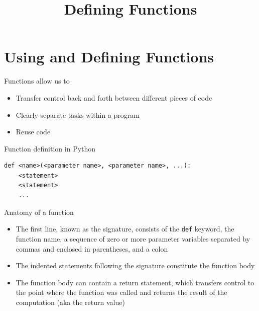 \documentclass[8pt,a4paper,compress]{beamer}
\title{Defining Functions}
\date{}
\begin{document}
\begin{frame}
\vfill
\titlepage
\end{frame}

\section{Using and Defining Functions}
\begin{frame}[fragile]
\pause

Functions allow us to
\begin{itemize}
\pause
\item Transfer control back and forth between different pieces of code
\pause
\item Clearly separate tasks within a program
\pause
\item Reuse code
\end{itemize}

\pause
\bigskip

Function definition in Python

\smallskip

\begin{lstlisting}[language={},style=focusin]
def <name>(<parameter name>, <parameter name>, ...):
    <statement>
    <statement>
    ...
\end{lstlisting}

\pause
\bigskip

Anatomy of a function
\begin{itemize}
\pause
\item The first line, known as the signature, consists of the \lstinline{def} keyword, the function name, a sequence of zero or more parameter variables separated by commas and enclosed in parentheses, and a colon

\pause
\item The indented statements following the signature constitute the function body

\pause
\item The function body can contain a return statement, which transfers control to the point where the function was called and returns the result of the computation (aka the return value)
\end{itemize}
\end{frame}
\end{document}
